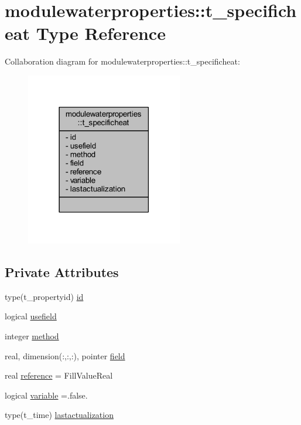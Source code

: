 \hypertarget{structmodulewaterproperties_1_1t__specificheat}{}\section{modulewaterproperties\+:\+:t\+\_\+specificheat Type Reference}
\label{structmodulewaterproperties_1_1t__specificheat}


Collaboration diagram for modulewaterproperties\+:\+:t\+\_\+specificheat\+:\nopagebreak
\begin{figure}[H]
\begin{center}
\leavevmode
\includegraphics[width=194pt]{structmodulewaterproperties_1_1t__specificheat__coll__graph}
\end{center}
\end{figure}
\subsection*{Private Attributes}
\begin{DoxyCompactItemize}
\item 
type(t\+\_\+propertyid) \mbox{\hyperlink{structmodulewaterproperties_1_1t__specificheat_ae7f714bc7868074e59daa2fded0a251f}{id}}
\item 
logical \mbox{\hyperlink{structmodulewaterproperties_1_1t__specificheat_a96e1a7039a733e585cbb50f065c344cc}{usefield}}
\item 
integer \mbox{\hyperlink{structmodulewaterproperties_1_1t__specificheat_a912d305a7b7d42ed4f7c7b269c0beda0}{method}}
\item 
real, dimension(\+:,\+:,\+:), pointer \mbox{\hyperlink{structmodulewaterproperties_1_1t__specificheat_ab77bcd1c50482708e6c601694d564fa0}{field}}
\item 
real \mbox{\hyperlink{structmodulewaterproperties_1_1t__specificheat_acedce64583036aefb5c57736386e9e5b}{reference}} = Fill\+Value\+Real
\item 
logical \mbox{\hyperlink{structmodulewaterproperties_1_1t__specificheat_a30d972dbc275738ed432778780a27021}{variable}} =.false.
\item 
type(t\+\_\+time) \mbox{\hyperlink{structmodulewaterproperties_1_1t__specificheat_a5189c95fddfc3145a7b56702d2242e09}{lastactualization}}
\end{DoxyCompactItemize}


